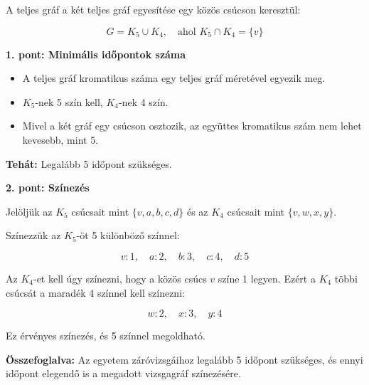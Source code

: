 \begin{solution}
	A teljes gráf a két teljes gráf egyesítése egy közös csúcson keresztül:

\[
G=K_{5}\cup K_{4},\quad\text{ahol }K_{5}\cap K_{4}=\{v\}
\]

\textbf{1. pont: Minimális időpontok száma}
\begin{itemize}
	\item A teljes gráf kromatikus száma egy teljes gráf méretével egyezik meg. 
	\item $K_{5}$-nek 5 szín kell, $K_{4}$-nek 4 szín. 
	\item Mivel a két gráf egy csúcson osztozik, az együttes kromatikus szám
	nem lehet kevesebb, mint 5. 
\end{itemize}
\medskip{}

\textbf{Tehát:} Legalább 5 időpont szükséges.

\bigskip{}

\textbf{2. pont: Színezés}

Jelöljük az $K_{5}$ csúcsait mint $\{v,a,b,c,d\}$ és az $K_{4}$
csúcsait mint $\{v,w,x,y\}$.

\medskip{}

Színezzük az $K_{5}$-öt 5 különböző színnel:

\[
v:1,\quad a:2,\quad b:3,\quad c:4,\quad d:5
\]

Az $K_{4}$-et kell úgy színezni, hogy a közös csúcs $v$ színe 1
legyen. Ezért a $K_{4}$ többi csúcsát a maradék 4 színnel kell színezni:

\[
w:2,\quad x:3,\quad y:4
\]

Ez érvényes színezés, és 5 színnel megoldható.

\textbf{Összefoglalva:} Az egyetem záróvizsgáihoz legalább 5 időpont
szükséges, és ennyi időpont elegendő is a megadott vizsgagráf színezésére.
\end{solution}



